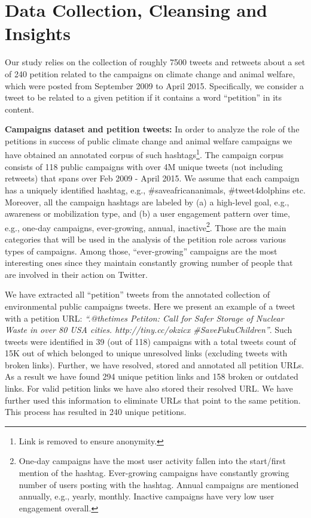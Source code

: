 \section{Data Collection, Cleansing and Insights}
\label{sec:dataset}

Our study relies on the collection of roughly 7500 tweets and retweets about a set of 240 petition related to the campaigns on climate change and animal welfare, which were posted from September 2009 to April 2015. Specifically, we consider a tweet to be related to a given petition if it contains a word ``petition'' in its content.

\textbf{Campaigns dataset and petition tweets:}
In order to analyze the role of the petitions in success of public climate change and animal welfare campaigns
we have obtained an annotated corpus of such hashtags\footnote{Link is removed to ensure anonymity.}.
The campaign corpus consists of 118 public campaigns with over 4M unique tweets (not including retweets) that spans over Feb 2009 - April 2015. 
We assume that each campaign has a uniquely identified hashtag, e.g., \#saveafricananimals, \#tweet4dolphins etc.
Moreover, all the campaign hashtags are labeled by (a) a high-level goal, e.g., awareness or mobilization type, and (b) a user engagement pattern over time, e.g., one-day campaigns, ever-growing, annual, inactive\footnote{One-day campaigns have the most user activity fallen into the start/first mention of the hashtag.
Ever-growing campaigns have constantly growing number of users posting with the hashtag.
Annual campaigns are mentioned annually, e.g., yearly, monthly. Inactive campaigns have very low user engagement overall.}.
Those are the main categories that will be used in the analysis of the petition role across various types of campaigns. Among those, ``ever-growing'' campaigns are the most interesting ones since they maintain constantly growing number of people that are involved in their action on Twitter.

We have extracted all ``petition'' tweets from the annotated collection of environmental public campaigns tweets.
Here we present an example of a tweet with a petition URL: \textit{``.@thetimes Petiton: Call for Safer Storage of Nuclear Waste in over 80 USA cities. http://tiny.cc/okzicx  \#SaveFukuChildren''}.
Such tweets were identified in 39 (out of 118) campaigns with a total tweets count of 15K out of which belonged to unique unresolved links (excluding tweets with broken links).
Further, we have resolved, stored and annotated all petition URLs. As a result we have found 294 unique petition links and 158 broken or outdated links.
For valid petition links we have also stored their resolved URL. We have further used this information to eliminate URLs that point to the same petition.
This process has resulted in 240 unique petitions.


